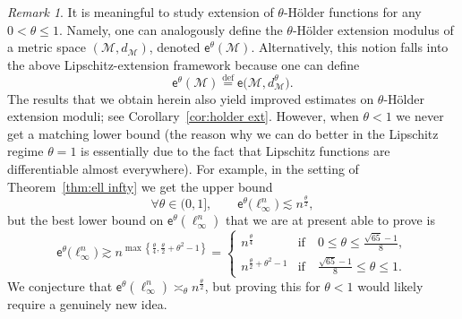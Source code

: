 \documentclass[11pt,reqno]{amsart}
\renewcommand{\le}{\leqslant}
\theoremstyle{remark}
\newtheorem{remark}[theorem]{Remark}
\newcommand{\MM}{\mathcal{M}}
\newcommand{\eqdef}{\stackrel{\mathrm{def}}{=}}
\newcommand{\ee}{\mathsf{e}}
\renewcommand{\1}{\mathbf 1}
\begin{document}
\begin{remark}\label{rem:holder} It is meaningful to study extension of $\theta$-H\"older functions for any $0<\theta\le 1$. Namely, one can analogously define the $\theta$-H\"older extension modulus of a metric space $(\MM,d_\MM)$, denoted $\ee^\theta(\MM)$. Alternatively, this notion falls into the above Lipschitz-extension framework because one can define
\begin{equation}\label{eq:define holder ext}
\ee^\theta(\MM)\eqdef \ee\big(\MM,d_\MM^\theta\big).
\end{equation}
The results that we obtain herein also yield improved estimates on $\theta$-H\"older extension moduli; see Corollary~\ref{cor:holder ext}. However, when $\theta<1$ we never get a matching lower bound (the reason why we can do better in the Lipschitz regime $\theta=1$ is essentially due to the fact that Lipschitz functions are differentiable almost everywhere).  For example, in the setting of Theorem~\ref{thm:ell infty} we get the upper bound
\begin{equation}\label{eq:theta holder l infty}
\forall \theta\in (0,1],\qquad \ee^\theta\big(\ell_\infty^n\big)\lesssim n^{\frac{\theta}{2}},
\end{equation}
but the best lower bound on $\ee^\theta(\ell_\infty^n)$ that we are at present able to prove is
\begin{equation}\label{eq:lower theta holder l infty}
\ee^\theta\big(\ell_\infty^n\big)\gtrsim n^{\max\left\{\frac{\theta}{4},\frac{\theta}{2}+\theta^2-1\right\}}=\left\{\begin{array}{ll}n^{\frac{\theta}{4}}&\mathrm{if}\quad 0\le \theta\le \frac{\sqrt{65}-1}{8},\\
n^{\frac{\theta}{2}+\theta^2-1}&\mathrm{if}\quad  \frac{\sqrt{65}-1}{8}\le \theta\le 1.\end{array}\right.
\end{equation}
We conjecture that $\ee^\theta(\ell_\infty^n)\asymp_\theta n^{\frac{\theta}{2}}$, but proving this for $\theta<1$  would likely require a genuinely new idea.
\end{remark}
\end{document}
